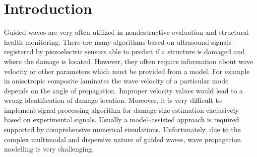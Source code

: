 \documentclass[12pt]{iopart}
\begin{document}
%
\submitto{\SMS}
%
% 
%



\section{Introduction}\label{sec1}

Guided waves are very often utilized in nondestructive evaluation and structural health monitoring. There are many algorithms based on ultrasound signals registered by piezoelectric sensors able to predict if a structure is damaged and where the damage is located. However, they often require information about wave velocity or other parameters which must be provided from a model. For example in anisotropic composite laminates the wave velocity of a particular mode depends on the angle of propagation. Improper velocity values would lead to a wrong identification of damage location.  Moreover, it is very difficult to implement signal processing algorithm for damage size estimation exclusively based on experimental signals. Usually a model--assisted approach is required supported by comprehensive numerical simulations. Unfortunately, due to the complex multimodal and dispersive nature of guided waves, wave propagation modelling is very challenging. 
\end{document}
